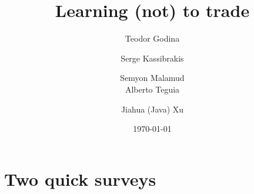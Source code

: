 \documentclass{beamer}
\title[Short title]{Learning (not) to trade} %
\author{Teodor Godina \and Serge Kassibrakis \and Semyon Malamud 
	\\ 
	Alberto Teguia \and Jiahua (Java) Xu} %
\institute[EPFL]
{
Swissquote, EPFL, SFI, UBC \\ %
\medskip
}
\date{\today} %
\begin{document}
\begin{frame}
\titlepage %
\end{frame}



\section{Two quick surveys}
\end{document}
